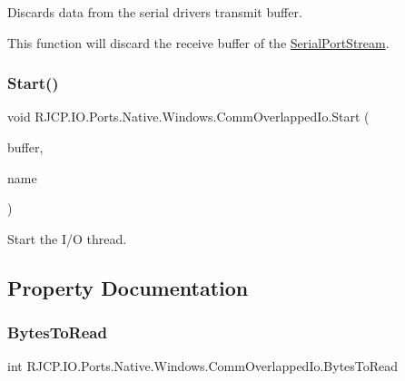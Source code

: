 Discards data from the serial driver\textquotesingle{}s transmit buffer. 

This function will discard the receive buffer of the \mbox{\hyperlink{class_r_j_c_p_1_1_i_o_1_1_ports_1_1_serial_port_stream}{Serial\+Port\+Stream}}. \mbox{\label{class_r_j_c_p_1_1_i_o_1_1_ports_1_1_native_1_1_windows_1_1_comm_overlapped_io_a5ffd962fba1ff7536443d1f5b107dbd1}} 
\subsubsection{\texorpdfstring{Start()}{Start()}}
{\footnotesize\ttfamily void R\+J\+C\+P.\+I\+O.\+Ports.\+Native.\+Windows.\+Comm\+Overlapped\+Io.\+Start (\begin{DoxyParamCaption}\item[{\mbox{\hyperlink{class_r_j_c_p_1_1_i_o_1_1_ports_1_1_native_1_1_serial_buffer}{Serial\+Buffer}}}]{buffer,  }\item[{string}]{name }\end{DoxyParamCaption})}



Start the I/O thread. 



\subsection{Property Documentation}
\mbox{\label{class_r_j_c_p_1_1_i_o_1_1_ports_1_1_native_1_1_windows_1_1_comm_overlapped_io_a81c3607f88b61c951fcabe4aeb4bc90c}} 
\subsubsection{\texorpdfstring{BytesToRead}{BytesToRead}}
{\footnotesize\ttfamily int R\+J\+C\+P.\+I\+O.\+Ports.\+Native.\+Windows.\+Comm\+Overlapped\+Io.\+Bytes\+To\+Read\hspace{0.3cm}{\ttfamily [get]}}



